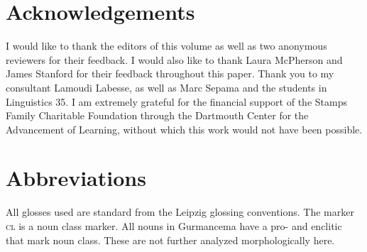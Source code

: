 \documentclass[output=paper,newtxmath,modfonts,nonflat,draftmode]{langsci/langscibook}
\begin{document}
\section*{Acknowledgements}

I would like to thank the editors of this volume as well as two anonymous reviewers for their feedback. I would also like to thank Laura McPherson and James Stanford for their feedback throughout this paper. Thank you to my consultant Lamoudi Labesse, as well as Marc Sepama and the 
students in Linguistics 35. I am extremely grateful for the financial support of the Stamps Family Charitable Foundation through the Dartmouth Center for the Advancement of 
Learning, without which this work would not have been possible. 

\section*{Abbreviations}
All glosses used are standard from the Leipzig glossing conventions. The marker \textsc{cl} is a noun class marker. All nouns in Gurmancema have a 
pro- and enclitic that mark noun class. These are not further analyzed morphologically here. 

{\sloppy\printbibliography[heading=subbibliography,notkeyword=this]}
\end{document}
